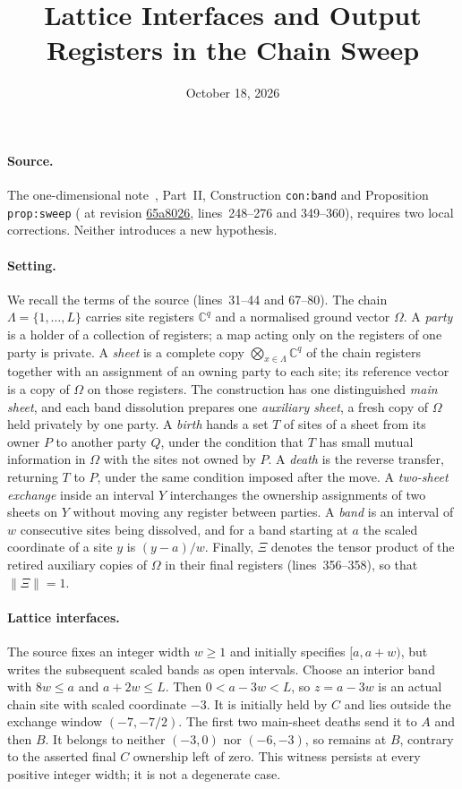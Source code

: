 \documentclass[10pt]{article}
\title{Lattice Interfaces and Output Registers in the Chain Sweep}
\author{}
\date{October 18, 2026}
\begin{document}
\maketitle
{}

\paragraph{Source.}
The one-dimensional note~\cite{TNLean2026OneDimensional}, Part~II,
Construction \texttt{con:band} and Proposition \texttt{prop:sweep}
( at revision
\href{https://github.com/LionSR/TNLean/blob/65a8026e8489243b870c70daf872eed5c5f6cfc6/docs/notes/one_dimensional_note/part2b_mps_protocol.tex}{65a8026},
lines~248--276 and 349--360),
requires two local corrections. Neither introduces a new hypothesis.

\paragraph{Setting.}
We recall the terms of the source (lines~31--44 and 67--80). The chain
$\Lambda=\{1,\dots,L\}$ carries site registers $\mathbb C^q$ and a
normalised ground vector $\Omega$. A \emph{party} is a holder of a
collection of registers; a map acting only on the registers of one party
is private. A \emph{sheet} is a complete copy
$\bigotimes_{x\in\Lambda}\mathbb C^q$ of the chain registers together
with an assignment of an owning party to each site; its reference vector is
a copy of $\Omega$ on those registers. The construction has one
distinguished \emph{main sheet}, and each band dissolution prepares one
\emph{auxiliary sheet}, a fresh copy of $\Omega$ held privately by one
party. A \emph{birth} hands a set $T$ of sites of a sheet from its owner
$P$ to another party $Q$, under the condition that $T$ has small mutual
information in $\Omega$ with the sites not owned by $P$. A \emph{death}
is the reverse transfer, returning $T$ to $P$, under the same condition
imposed after the move. A \emph{two-sheet exchange} inside an interval $Y$
interchanges the ownership assignments of two sheets on $Y$ without moving
any register between parties. A \emph{band} is an interval of $w$
consecutive sites being dissolved, and for a band starting at $a$ the scaled
coordinate of a site $y$ is $(y-a)/w$. Finally, $\Xi$ denotes the tensor
product of the retired auxiliary copies of $\Omega$ in their final
registers (lines~356--358), so that $\|\Xi\|=1$.
\paragraph{Lattice interfaces.}
The source fixes an integer width $w\ge1$ and initially specifies
$[a,a+w)$, but writes the subsequent scaled bands as open intervals.
Choose an interior band with $8w\le a$ and $a+2w\le L$.
Then $0<a-3w<L$, so $z=a-3w$ is an actual chain site with scaled
coordinate $-3$. It is initially held by $C$ and lies outside the exchange
window $(-7,-7/2)$. The first two main-sheet deaths send it to $A$ and
then $B$. It belongs to neither $(-3,0)$ nor $(-6,-3)$, so remains at
$B$, contrary to the asserted final $C$ ownership left of zero. This
witness persists at every positive integer width; it is not a degenerate
case.
\end{document}
